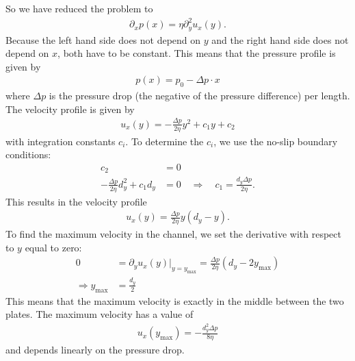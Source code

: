 \documentclass[a4paper,10pt,bibtotoc]{scrartcl}
\begin{document}
So we have reduced the problem to
\begin{align}
 \partial_x p(x) = \eta\partial_y^2 u_x(y).
\end{align}
Because the left hand side does not depend on $y$ and the right hand side does not depend on $x$, both have to be constant. This means that the pressure profile is given by
\begin{align}
 p(x) = p_0 - \Delta p\cdot x
\end{align}
where $\Delta p$ is the pressure drop (the negative of the pressure difference) per length. The velocity profile is given by
\begin{align}
 u_x(y) = -\frac{\Delta p}{2\eta} y^2 + c_1 y + c_2
\end{align}
with integration constants $c_i$. To determine the $c_i$, we use the no-slip boundary conditions:
\begin{align}
 c_2 &= 0\\
 -\frac{\Delta p}{2\eta} d_y^2 + c_1 d_y &= 0\quad\Rightarrow\quad c_1 =\frac{d_y\Delta p}{2\eta}.
\end{align}
This results in the velocity profile 
\begin{align}
 u_x(y) = \frac{\Delta p}{2\eta}y\left(d_y - y\right).
\end{align}
To find the maximum velocity in the channel, we set the derivative with respect to $y$ equal to zero:
\begin{align}
 0 &= \partial_y u_x(y)\bigg\vert_{y = y_\mathrm{max}} = \frac{\Delta p}{2\eta}\left(d_y - 2y_\mathrm{max}\right)\\
 \Rightarrow y_\mathrm{max} &= \frac{d_y}{2}
\end{align}
This means that the maximum velocity is exactly in the middle between the two plates. The maximum velocity has a value of
\begin{align}
 u_x(y_\mathrm{max}) =-\frac{d_y^2\Delta p}{8\eta}
\end{align}
and depends linearly on the pressure drop. 
\end{document}
